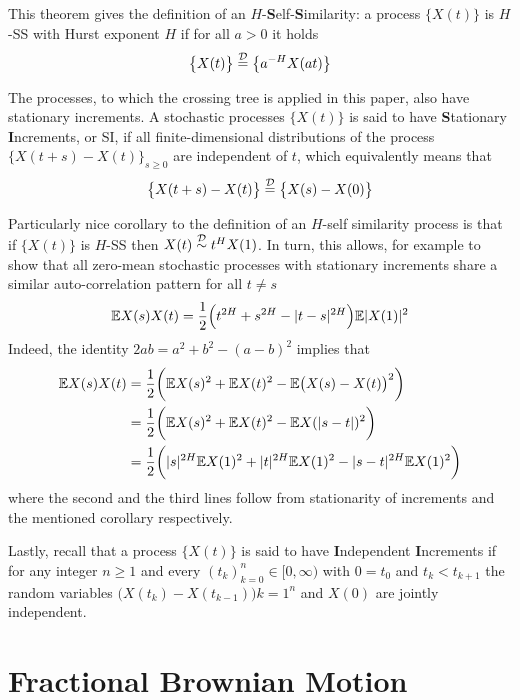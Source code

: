 This theorem gives the definition of an $H$-\textbf{S}elf-\textbf{S}imilarity: a process
$\bigl\{X(t)\bigr\}$ is $H$-SS with Hurst exponent $H$ if for all $a>0$ it holds
\[ \bigl\{X(t)\bigr\} \overset{\mathcal{D}}{=} \bigl\{a^{-H} X(at)\bigr\} \]

The processes, to which the crossing tree is applied in this paper, also have stationary
increments. A stochastic processes $\bigl\{X(t)\bigr\}$ is said to have \textbf{S}tationary
\textbf{I}ncrements, or SI, if all finite-dimensional distributions of the process
$\bigl\{X(t+s) - X(t)\bigr\}_{s\geq0}$ are independent of $t$, which equivalently means
that
\[ \bigl\{X(t+s)-X(t)\bigr\} \overset{\mathcal{D}}{=} \bigl\{X(s)-X(0)\bigr\} \]

Particularly nice corollary to the definition of an $H$-self similarity process is that
if $\bigl\{X(t)\bigr\}$ is $H$-SS then $X(t)\overset{\mathcal{D}}{\sim}t^H X(1)$. In turn,
this allows, for example to show that all zero-mean stochastic processes with stationary
increments share a similar auto-correlation pattern for all $t\neq s$
\[ \mathbb{E} X(s) X(t) = \frac{1}{2}\Bigl( t^{2H} + s^{2H} - |t-s|^{2H}\Bigr) \mathbb{E}|X(1)|^2 \]
Indeed, the identity $2 a b = a^2 + b^2 - (a-b)^2$ implies that\begin{align*}
	\mathbb{E} X(s) X(t)
	&= \frac{1}{2}\biggl( \mathbb{E} X(s)^2 + \mathbb{E} X(t)^2 - \mathbb{E}\bigl( X(s) - X(t) \bigr)^2 \biggr) \\
	&= \frac{1}{2}\biggl( \mathbb{E} X(s)^2 + \mathbb{E} X(t)^2 - \mathbb{E} X(|s-t|)^2 \biggr) \\
	&= \frac{1}{2}\biggl( |s|^{2H} \mathbb{E} X(1)^2 + |t|^{2H} \mathbb{E} X(1)^2 - |s-t|^{2H} \mathbb{E} X(1)^2 \biggr)
\end{align*}
where the second and the third lines follow from stationarity of increments and the
mentioned corollary respectively.

Lastly, recall that a process $\bigl\{X(t)\bigr\}$ is said to have \textbf{I}ndependent
\textbf{I}ncrements if for any integer $n\geq1$ and every $(t_k)_{k=0}^n\in[0,\infty)$
with $0=t_0$ and $t_k < t_{k+1}$ the random variables $\bigl(X(t_k) - X(t_{k-1})\bigr){k=1}^n$
and $X(0)$ are jointly independent.


\section{Fractional Brownian Motion} %
\label{sec:fractional_brownian_motion}

